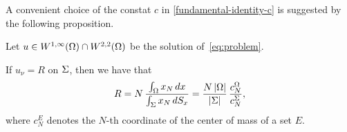 \documentclass[a4paper,10pt]{amsart}
\numberwithin{equation}{section}
\begin{document}
A convenient choice of the constat $c$ in \eqref{fundamental-identity-c} is suggested by the following proposition. 



%

\begin{prop}
\label{prop:value-R}
Let $u \in W^{1,\infty}(\Omega) \cap W^{2,2} (\Omega)$ be the solution of~\eqref{eq:problem}.  
\par
If $u_\nu=R$ on $\Sigma$, then we have that
\begin{equation}
\label{value-R}
R=N\,\frac{\int_\Omega x_N\,dx}{\int_\Sigma x_N\,dS_x}
=\frac{N\,|\Omega|}{|\Sigma|}\,\frac{c_N^\Omega}{c_N^\Sigma},
\end{equation}
where $c_N^E$ denotes the $N$-th coordinate of the center of mass of a set $E$. 
\end{prop}
\end{document}

